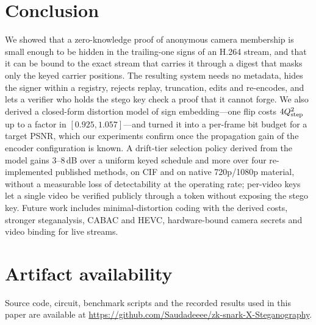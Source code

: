 \section{Conclusion}
\label{sec:conclusion}

We showed that a zero-knowledge proof of anonymous camera membership is small enough to be hidden in the trailing-one signs of an H.264 stream, and that it can be bound to the exact stream that carries it through a digest that masks only the keyed carrier positions. The resulting system needs no metadata, hides the signer within a registry, rejects replay, truncation, edits and re-encodes, and lets a verifier who holds the stego key check a proof that it cannot forge. We also derived a closed-form distortion model of sign embedding---one flip costs $4Q_{\mathrm{step}}^2$ up to a factor in $[0.925,1.057]$---and turned it into a per-frame bit budget for a target PSNR, which our experiments confirm once the propagation gain of the encoder configuration is known. A drift-tier selection policy derived from the model gains 3--8\,dB over a uniform keyed schedule and more over four re-implemented published methods, on CIF and on native 720p/1080p material, without a measurable loss of detectability at the operating rate; per-video keys let a single video be verified publicly through a token without exposing the stego key. Future work includes minimal-distortion coding with the derived costs, stronger steganalysis, CABAC and HEVC, hardware-bound camera secrets and video binding for live streams.

\section*{Artifact availability}
Source code, circuit, benchmark scripts and the recorded results used in this paper are available at \url{https://github.com/Saudadeeee/zk-snark-X-Steganography}.
